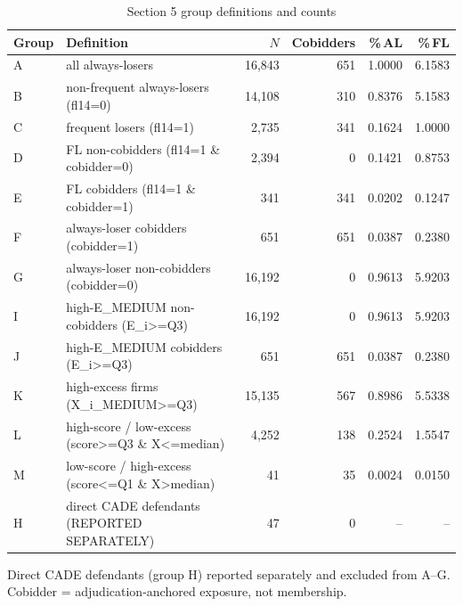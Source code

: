 \begin{table}[htbp]\centering
\caption{Section 5 group definitions and counts}
\label{tab:s5_group_counts}
\begin{tabular}{llrrrr}\hline
Group & Definition & $N$ & Cobidders & \%\,AL & \%\,FL \\\hline
A & all always-losers & 16,843 & 651 & 1.0000 & 6.1583 \\
B & non-frequent always-losers (fl14=0) & 14,108 & 310 & 0.8376 & 5.1583 \\
C & frequent losers (fl14=1) & 2,735 & 341 & 0.1624 & 1.0000 \\
D & FL non-cobidders (fl14=1 \& cobidder=0) & 2,394 &   0 & 0.1421 & 0.8753 \\
E & FL cobidders (fl14=1 \& cobidder=1) & 341 & 341 & 0.0202 & 0.1247 \\
F & always-loser cobidders (cobidder=1) & 651 & 651 & 0.0387 & 0.2380 \\
G & always-loser non-cobidders (cobidder=0) & 16,192 &   0 & 0.9613 & 5.9203 \\
I & high-E\_MEDIUM non-cobidders (E\_i>=Q3) & 16,192 &   0 & 0.9613 & 5.9203 \\
J & high-E\_MEDIUM cobidders (E\_i>=Q3) & 651 & 651 & 0.0387 & 0.2380 \\
K & high-excess firms (X\_i\_MEDIUM>=Q3) & 15,135 & 567 & 0.8986 & 5.5338 \\
L & high-score / low-excess (score>=Q3 \& X<=median) & 4,252 & 138 & 0.2524 & 1.5547 \\
M & low-score / high-excess (score<=Q1 \& X>median) & 41 &  35 & 0.0024 & 0.0150 \\
H & direct CADE defendants (REPORTED SEPARATELY) & 47 &   0 & -- & -- \\
\hline\end{tabular}
\begin{tablenotes}\footnotesize\item Direct CADE defendants (group H) reported separately and excluded from A--G. Cobidder = adjudication-anchored exposure, not membership.\end{tablenotes}
\end{table}
